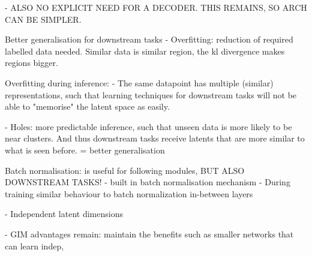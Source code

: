 		- ALSO NO EXPLICIT NEED FOR A DECODER. THIS REMAINS, SO ARCH CAN BE SIMPLER.
	
	Better generalisation for downstream tasks
		- Overfitting: reduction of required labelled data needed. Similar data is similar region, the kl divergence makes regions bigger.

		Overfitting during inference:
		- The same datapoint has multiple (similar) representations, such that learning techniques for downstream tasks will not be able to "memorise" the latent space as easily.
		
		- Holes: more predictable inference, such that unseen data is more likely to be near clusters. And thus downstream tasks receive latents that are more similar to what is seen before.
		= better generalisation
		


	Batch normalisation: is useful for following modules, BUT ALSO DOWNSTREAM TASKS!
		- built in batch normalisation mechanism
		- During training similar behaviour to batch normalization in-between layers
	
	- Independent latent dimensions
		
	- GIM advantages remain: maintain the benefits such as smaller networks that can learn indep, 
	
	
	
	

	









